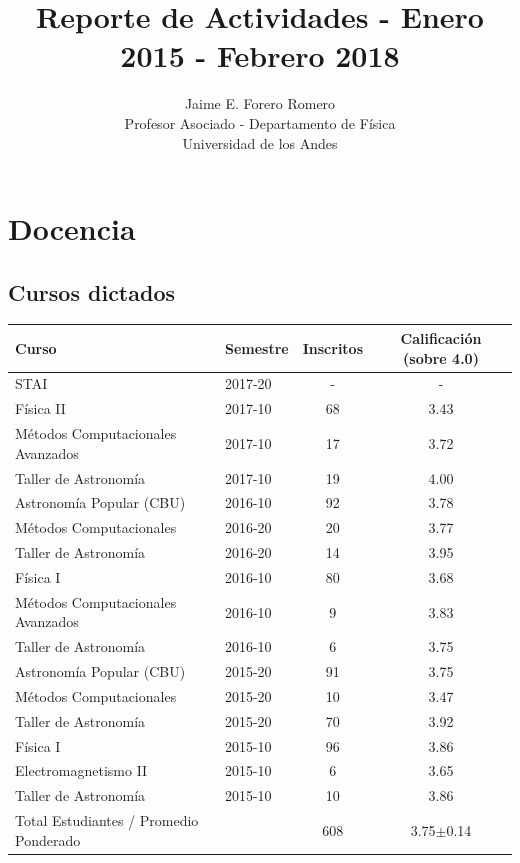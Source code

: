 \documentclass{article}
\title{Reporte de Actividades - Enero 2015 - Febrero 2018}
\author{Jaime E. Forero Romero\\Profesor Asociado - Departamento de
  F\'isica\\Universidad de los Andes}
\begin{document}
\maketitle
\tableofcontents
\newpage

\section{Docencia}

\subsection{Cursos dictados}
\begin{tabular}{p{6.5cm} l c c}\hline
Curso & Semestre & Inscritos & Calificaci\'on (sobre
4.0)\\\hline
STAI & 2017-20 & - & -\\\hline
F\'isica II & 2017-10 & 68 & 3.43\\
M\'etodos Computacionales Avanzados & 2017-10 & 17 & 3.72\\ 
Taller de Astronom\'ia & 2017-10 & 19 & 4.00\\\hline
Astronom\'ia Popular (CBU) & 2016-10 & 92 & 3.78\\
M\'etodos Computacionales & 2016-20 & 20 & 3.77\\
Taller de Astronom\'ia & 2016-20 & 14 & 3.95\\\hline
F\'isica I & 2016-10 & 80 & 3.68\\
M\'etodos Computacionales Avanzados & 2016-10 & 9 & 3.83\\
Taller de Astronom\'ia & 2016-10 & 6 & 3.75\\\hline
Astronom\'ia Popular (CBU) & 2015-20 & 91 & 3.75\\ 
M\'etodos Computacionales & 2015-20 & 10 & 3.47\\
Taller de Astronom\'ia & 2015-20 & 70 & 3.92\\\hline
F\'isica I & 2015-10 & 96 & 3.86\\
Electromagnetismo II & 2015-10 & 6 & 3.65 \\
Taller de Astronom\'ia & 2015-10 & 10 & 3.86\\\hline
Total Estudiantes / Promedio Ponderado & & 608 & 3.75$\pm$0.14 \\\hline
\end{tabular}
\end{document}
